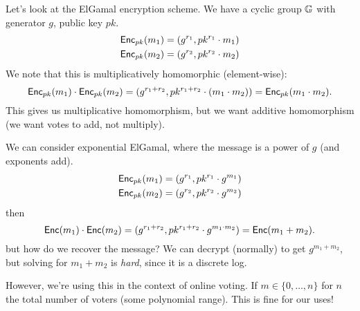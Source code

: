 \begin{example}
    Let's look at the ElGamal encryption scheme. We have a cyclic group $\mathbb G$ with generator $g$, public key $pk$.
    \begin{align*}
        \operatorname{\mathsf{Enc}}_{pk}(m_1) & =(g^{r_1}, pk^{r_1}\cdot m_1) \\
        \operatorname{\mathsf{Enc}}_{pk}(m_2) & =(g^{r_2}, pk^{r_2}\cdot m_2)
    \end{align*}
    We note that this is multiplicatively homomorphic (element-wise):
    \[\operatorname{\mathsf{Enc}}_{pk}(m_1)\cdot \operatorname{\mathsf{Enc}}_{pk}(m_2) = (g^{r_1 + r_2}, pk^{r_1 + r_2}\cdot (m_1\cdot m_2)) = \operatorname{\mathsf{Enc}}_{pk}(m_1\cdot m_2).\]
    This gives us multiplicative homomorphism, but we want additive homomorphism (we want votes to add, not multiply).

    We can consider exponential ElGamal, where the message is a power of $g$ (and exponents add).
    \begin{align*}
        \operatorname{\mathsf{Enc}}_{pk}(m_1) & =(g^{r_1}, pk^{r_1}\cdot g^{m_1}) \\
        \operatorname{\mathsf{Enc}}_{pk}(m_2) & =(g^{r_2}, pk^{r_2}\cdot g^{m_2})
    \end{align*}
    then
    \[\operatorname{\mathsf{Enc}}(m_1)\cdot \operatorname{\mathsf{Enc}}(m_2) = (g^{r_1 + r_2}, pk^{r_1 + r_2}\cdot g^{m_1\cdot m_2}) = \operatorname{\mathsf{Enc}}(m_1 + m_2).\]
    but how do we recover the message? We can decrypt (normally) to get $g^{m_1 + m_2}$, but solving for $m_1 + m_2$ is \emph{hard}, since it is a discrete log.

    However, we're using this in the context of online voting. If $m\in \{0, \dots, n\}$ for $n$ the total number of voters (some polynomial range). This is fine for our uses!
\end{example}
